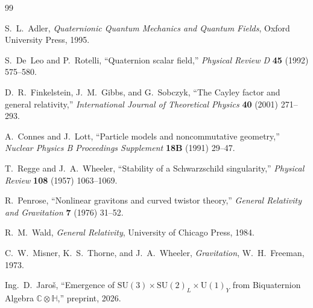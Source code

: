 \documentclass[12pt,a4paper]{article}
\theoremstyle{definition}
\theoremstyle{remark}
\begin{document}

\begin{thebibliography}{99}

S.~L.~Adler,
\textit{Quaternionic Quantum Mechanics and Quantum Fields},
Oxford University Press, 1995.

S.~De~Leo and P.~Rotelli,
``Quaternion scalar field,''
\textit{Physical Review D} \textbf{45} (1992) 575--580.

D.~R.~Finkelstein, J.~M.~Gibbs, and G.~Sobczyk,
``The Cayley factor and general relativity,''
\textit{International Journal of Theoretical Physics} \textbf{40} (2001) 271--293.

A.~Connes and J.~Lott,
``Particle models and noncommutative geometry,''
\textit{Nuclear Physics B Proceedings Supplement} \textbf{18B} (1991) 29--47.

T.~Regge and J.~A.~Wheeler,
``Stability of a Schwarzschild singularity,''
\textit{Physical Review} \textbf{108} (1957) 1063--1069.

R.~Penrose,
``Nonlinear gravitons and curved twistor theory,''
\textit{General Relativity and Gravitation} \textbf{7} (1976) 31--52.

R.~M.~Wald,
\textit{General Relativity},
University of Chicago Press, 1984.

C.~W.~Misner, K.~S.~Thorne, and J.~A.~Wheeler,
\textit{Gravitation},
W.~H.~Freeman, 1973.

Ing.~D.~Jaroš,
``Emergence of $\mathrm{SU}(3)\times\mathrm{SU}(2)_L\times\mathrm{U}(1)_Y$
from Biquaternion Algebra $\mathbb{C}\otimes\mathbb{H}$,''
preprint, 2026.

\end{thebibliography}
\end{document}

